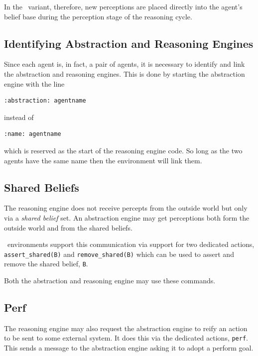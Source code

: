 In the \eass\ variant, therefore, new perceptions are placed directly into the agent's belief base during the perception stage of the reasoning cycle.

\subsection{Identifying Abstraction and Reasoning Engines}
Since each agent is, in fact, a pair of agents, it is necessary to identify and link the abstraction and reasoning engines.  This is done by starting the abstraction engine with the line
\begin{verbatim}
:abstraction: agentname
\end{verbatim} 
instead of 
\begin{verbatim}
:name: agentname
\end{verbatim} 
which is reserved as the start of the reasoning engine code.  So long as the two agents have the same name then the environment will link them.

\subsection{Shared Beliefs}
The reasoning engine does not receive percepts from the outside world but only via a \emph{shared belief} set.  An abstraction engine may get perceptions both form the outside world and from the shared beliefs.

\eass\ environments support this communication via support for two dedicated actions, \lstinline{assert_shared(B)} and \lstinline{remove_shared(B)} which can be used to assert and remove the shared belief, \lstinline{B}.

Both the abstraction and reasoning engine may use these commands.

\subsection{Perf}
The reasoning engine may also request the abstraction engine to reify an action to be sent to some external system.  It does this via the dedicated actions, \texttt{perf}.  This sends a message to the abstraction engine asking it to adopt a perform goal.

